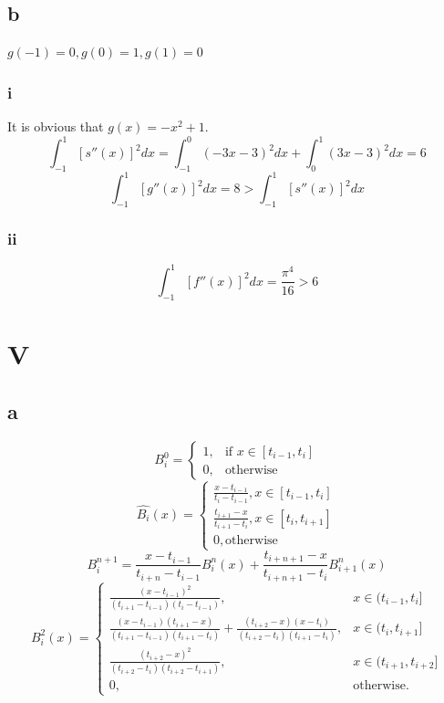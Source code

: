 \documentclass[a4paper]{article}
\begin{document}
\subsection*{b}
$g(-1)=0,g(0)=1,g(1)=0$
\subsubsection*{i}
It is obvious that $g(x)= -x^2+1$.
$$\int_{-1}^{1}[s''(x)]^2dx = \int_{-1}^{0}(-3x-3)^2dx + \int_{0}^{1}(3x-3)^2dx =6$$
$$\int_{-1}^{1}[g''(x)]^2dx  = 8 > \int_{-1}^{1}[s''(x)]^2dx $$
\subsubsection*{ii}
$$\int_{-1}^{1}[f''(x)]^2dx = \frac{\pi^4}{16}>6$$

\section*{V}
\subsection*{a}
\[
B^0_i=
\begin{cases}
1, & \text{if } x \in [t_{i-1},t_{i}] \\
0, & \text{otherwise}
\end{cases}
\]
\[
  \hat{B_i}(x)=
  \begin{cases}
  \frac{x-t_{i-1}}{t_{i}-t_{i-1}}, x \in [t_{i-1},t_{i}] \\
  \frac{t_{i+1}-x}{t_{i+1}-t_{i}}, x \in [t_{i},t_{i+1}] \\
  0, \text{otherwise}
  \end{cases}
\]
\[
  B^{n+1}_{i}=\frac{x-t_{i-1}}{t_{i+n}-t_{i-1}}B^n_i(x)+\frac{t_{i+n+1}-x}{t_{i+n+1}-t_i}B^n_{i+1}(x)
\]
\[
B^2_i(x) =
\begin{cases} 
\frac{(x - t_{i-1})^2}{(t_{i+1} - t_{i-1})(t_i - t_{i-1})}, & x \in (t_{i-1}, t_i] \\[12pt]
\frac{(x - t_{i-1})(t_{i+1} - x)}{(t_{i+1} - t_{i-1})(t_{i+1} - t_i)} + \frac{(t_{i+2} - x)(x - t_i)}{(t_{i+2} - t_i)(t_{i+1} - t_i)}, & x \in (t_i, t_{i+1}] \\[12pt]
\frac{(t_{i+2} - x)^2}{(t_{i+2} - t_i)(t_{i+2} - t_{i+1})}, & x \in (t_{i+1}, t_{i+2}] \\[12pt]
0, & \text{otherwise}.
\end{cases}
\]
\end{document}
